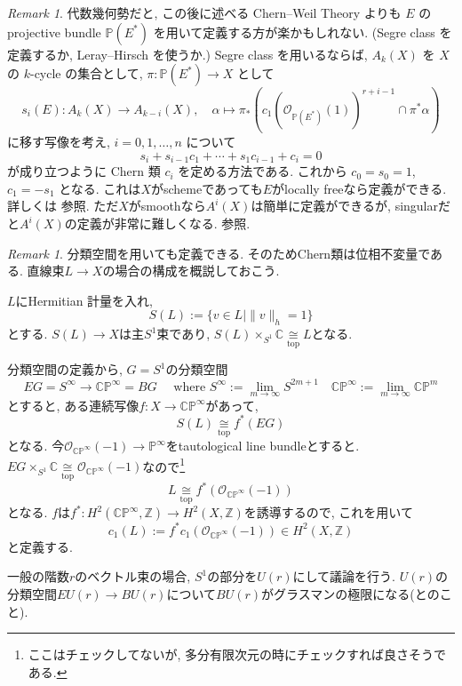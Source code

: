\documentclass[dvipdfmx,a4paper,11pt]{article} %
\theoremstyle{definition}
\theoremstyle{remark}
\newtheorem{rem}[thm]{Remark}
\numberwithin{equation}{section}
\newcommand{\Z}{\mathbb{Z}}
\newcommand{\C}{\mathbb{C}}
\begin{document}
\begin{rem}
代数幾何勢だと, この後に述べる Chern--Weil Theory よりも
\(E\) の projective bundle \(\mathbb{P}(E^*)\) を用いて定義する方が楽かもしれない.
(Segre class を定義するか, Leray--Hirsch を使うか.)
Segre class を用いるならば, \(A_{k}(X)\) を \(X\) の \(k\)-cycle の集合として, \(\pi: \mathbb{P}(E^*) \to X\) として
\[
s_i (E) : A_{k}(X) \to A_{k-i}(X),
\quad
\alpha \mapsto 
 \pi_{*}(c_1(\mathcal{O}_{\mathbb{P}(E^*)}(1))^{r + i-1} \cap \pi^{*}\alpha)
\]
に移す写像を考え, \(i=0,1,\ldots, n\) について
\[
s_i + s_{i-1}c_1 + \cdots + s_1 c_{i-1} + c_i=0
\]
が成り立つように Chern 類 \(c_i\) を定める方法である. これから \(c_0 = s_0 =1\), \(c_1 = - s_1\) となる. これは$X$がschemeであっても$E$がlocally freeなら定義ができる. 
詳しくは \cite[Ch.3 ]{Ful93} 参照.
ただ$X$がsmoothなら$A^i(X)$は簡単に定義ができるが, singularだと$A^i(X)$の定義が非常に難しくなる. \cite[Ch.17]{Ful93} 参照.
\end{rem}
\begin{rem}
分類空間を用いても定義できる. 
そのためChern類は位相不変量である.
直線束$L \to X$の場合の構成を概説しておこう. 

$L$にHermitian 計量を入れ, 
$$
S(L):=\{ v \in L \mid \| v\|_h =1\}
$$
とする. $S(L) \to X$は主$S^1$束であり, $S(L) \times_{S^1} \C \underset{\text{top}}{\cong} L$となる. 

分類空間の定義から, $G=S^1$の分類空間
$$
EG=S^{\infty} \to \C \mathbb{P}^{\infty}=BG
\quad 
\text{ where }
S^{\infty}:= \lim_{m \to \infty} S^{2m+1}
\quad
\C \mathbb{P}^{\infty}:=\lim_{m \to \infty} \C \mathbb{P}^{m}
$$
とすると, ある連続写像$f : X \to \C \mathbb{P}^{\infty}$があって, 
$$
S(L)\underset{\text{top}}{\cong}f^{*}(EG)
$$
となる. 
今$\mathcal{O}_{\C \mathbb{P}^{\infty}}(-1) \to \mathbb{P}^{\infty}$をtautological line bundleとすると. 
$EG \times_{S^1} \C \underset{\text{top}}{\cong}\mathcal{O}_{\C \mathbb{P}^{\infty}}(-1)$なので\footnote{ここはチェックしてないが, 多分有限次元の時にチェックすれば良さそうである.}
$$
L\underset{\text{top}}{\cong}f^{*}(\mathcal{O}_{\C \mathbb{P}^{\infty}}(-1))
$$
となる.  $f$は$f^{*} : H^{2}(\C \mathbb{P}^{\infty}, \Z) \to H^{2}(X, \Z)$を誘導するので, これを用いて
$$
c_1(L):=f^{*}c_1(\mathcal{O}_{\C \mathbb{P}^{\infty}}(-1))
\in H^2(X, \Z)
$$
と定義する. 

一般の階数$r$のベクトル束の場合, $S^1$の部分を$U(r)$にして議論を行う. 
$U(r)$の分類空間$EU(r) \to BU(r)$について$BU(r)$がグラスマンの極限になる(とのこと). 
\end{rem}
\end{document}
